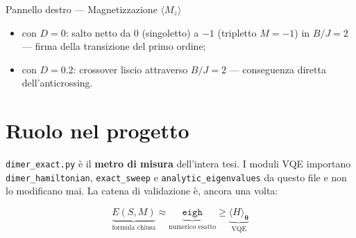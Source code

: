 \documentclass[11pt,a4paper]{article}
\begin{document}
\begin{panelbox}{Pannello destro --- Magnetizzazione $\langle M_z\rangle$}
\begin{itemize}[leftmargin=1.2em, itemsep=0.1em]
\item con $D=0$: salto netto da $0$ (singoletto) a $-1$ (tripletto
$M=-1$) in $B/J=2$ --- firma della transizione del primo ordine;
\item con $D=0.2$: crossover liscio attraverso $B/J=2$ --- conseguenza
diretta dell'anticrossing.
\end{itemize}
\end{panelbox}

\section*{Ruolo nel progetto}

\texttt{dimer\_exact.py} è il \textbf{metro di misura} dell'intera tesi. I
moduli VQE importano \texttt{dimer\_hamiltonian}, \texttt{exact\_sweep} e
\texttt{analytic\_eigenvalues} da questo file e non lo modificano mai. La
catena di validazione è, ancora una volta:

\begin{keyeq}
\centering
\begin{equation*}
\underbrace{E(S,M)}_{\text{formula chiusa}} \approx
\underbrace{\texttt{eigh}}_{\text{numerico esatto}} \geq
\underbrace{\langle H\rangle_{\boldsymbol\theta}}_{\text{VQE}}
\end{equation*}
\end{keyeq}
\end{document}
